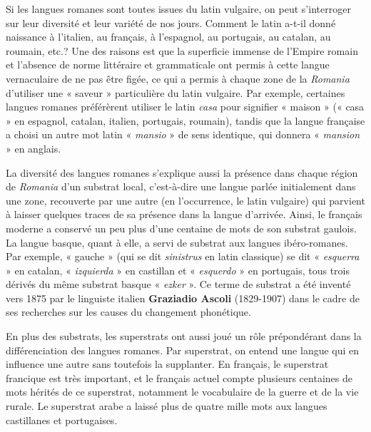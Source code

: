Si les langues romanes sont toutes issues du latin vulgaire, on peut s’interroger sur leur diversité et leur variété de nos jours. Comment le latin a-t-il donné naissance à l’italien, au français, à l’espagnol, au portugais, au catalan, au roumain, etc.? Une des raisons est que la superficie immense de l’Empire romain et l’absence de norme littéraire et grammaticale ont permis à cette langue vernaculaire de ne pas être figée, ce qui a permis à chaque zone de la \textit{Romania} d’utiliser une « saveur » particulière du latin vulgaire. Par exemple, certaines langues romanes préférèrent utiliser le latin \textit{casa} pour signifier « maison » (« casa » en espagnol, catalan, italien, portugais, roumain), tandis que la langue française a choisi un autre mot latin « \textit{mansio} » de sens identique, qui donnera « \textit{mansion} » en anglais.

La diversité des langues romanes s’explique aussi la présence dans chaque région de \textit{Romania} d’un substrat local, c’est-à-dire une langue parlée initialement dans une zone, recouverte par une autre (en l’occurrence, le latin vulgaire) qui parvient à laisser quelques traces de sa présence dans la langue d’arrivée. Ainsi, le français moderne a conservé un peu plus d’une centaine de mots de son substrat gaulois. La langue basque, quant à elle, a servi de substrat aux langues ibéro-romanes. Par exemple, « gauche » (qui se dit \textit{sinistrus} en latin classique) se dit « \textit{esquerra} » en catalan, « \textit{izquierda} » en castillan et « \textit{esquerdo} » en portugais, tous trois dérivés du même substrat basque « \textit{ezker} ». Ce terme de substrat a été inventé vers 1875 par le
linguiste italien \textbf{Graziadio Ascoli} (1829-1907) dans le cadre de ses recherches sur les causes du changement phonétique.

En plus des substrats, les superstrats ont aussi joué un rôle prépondérant dans la différenciation des langues romanes. Par superstrat, on entend une langue qui en influence une autre sans toutefois la supplanter. En français, le superstrat francique est très important, et le français actuel compte plusieurs centaines de mots hérités de ce superstrat, notamment le vocabulaire de la guerre et de la vie rurale. Le superstrat arabe a laissé plus de quatre mille mots aux langues castillanes et portugaises.

